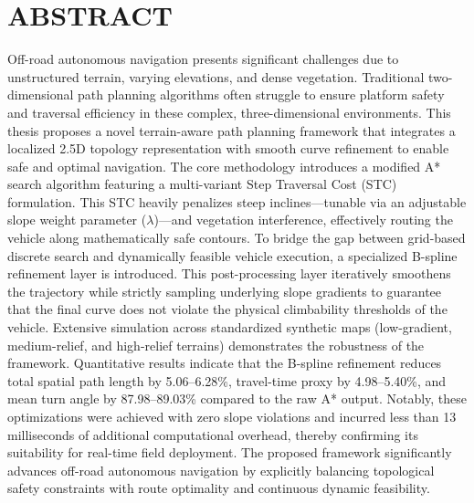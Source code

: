 \chapter{ABSTRACT}

\begin{singlespace}
\noindent
Off-road autonomous navigation presents significant challenges due to unstructured terrain, varying elevations, and dense vegetation. Traditional two-dimensional path planning algorithms often struggle to ensure platform safety and traversal efficiency in these complex, three-dimensional environments. This thesis proposes a novel terrain-aware path planning framework that integrates a localized 2.5D topology representation with smooth curve refinement to enable safe and optimal navigation. The core methodology introduces a modified A* search algorithm featuring a multi-variant Step Traversal Cost (STC) formulation. This STC heavily penalizes steep inclines---tunable via an adjustable slope weight parameter ($\lambda$)---and vegetation interference, effectively routing the vehicle along mathematically safe contours. To bridge the gap between grid-based discrete search and dynamically feasible vehicle execution, a specialized B-spline refinement layer is introduced. This post-processing layer iteratively smoothens the trajectory while strictly sampling underlying slope gradients to guarantee that the final curve does not violate the physical climbability thresholds of the vehicle. Extensive simulation across standardized synthetic maps (low-gradient, medium-relief, and high-relief terrains) demonstrates the robustness of the framework. Quantitative results indicate that the B-spline refinement reduces total spatial path length by 5.06--6.28\%, travel-time proxy by 4.98--5.40\%, and mean turn angle by 87.98--89.03\% compared to the raw A* output. Notably, these optimizations were achieved with zero slope violations and incurred less than 13 milliseconds of additional computational overhead, thereby confirming its suitability for real-time field deployment. The proposed framework significantly advances off-road autonomous navigation by explicitly balancing topological safety constraints with route optimality and continuous dynamic feasibility.
\end{singlespace}
